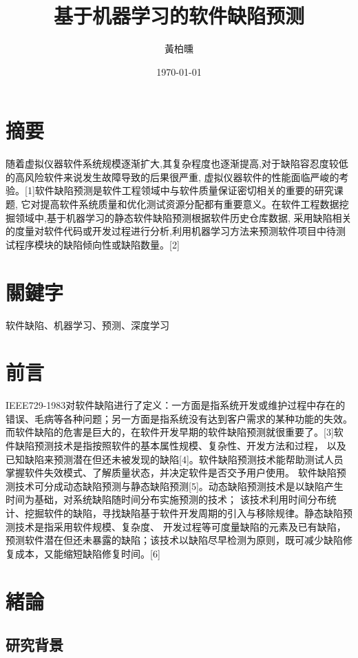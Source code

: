 \documentclass[12pt, a4paper]{article}
\author{黃柏曛}
\date{\today}
\title{基于机器学习的软件缺陷预测}
\begin{document}
\maketitle

\section{摘要}

随着虚拟仪器软件系统规模逐渐扩大,其复杂程度也逐渐提高,对于缺陷容忍度较低的高风险软件来说发生故障导致的后果很严重,
虚拟仪器软件的性能面临严峻的考验。[1]软件缺陷预测是软件工程领域中与软件质量保证密切相关的重要的研究课题,
它对提高软件系统质量和优化测试资源分配都有重要意义。在软件工程数据挖掘领域中,基于机器学习的静态软件缺陷预测根据软件历史仓库数据,
采用缺陷相关的度量对软件代码或开发过程进行分析,利用机器学习方法来预测软件项目中待测试程序模块的缺陷倾向性或缺陷数量。[2]

\section{關鍵字}

软件缺陷、机器学习、预测、深度学习 

\section{前言}

IEEE729-1983对软件缺陷进行了定义：一方面是指系统开发或维护过程中存在的错误、毛病等各种问题；另一方面是指系统没有达到客户需求的某种功能的失效。
而软件缺陷的危害是巨大的，在软件开发早期的软件缺陷预测就很重要了。[3]软件缺陷预测技术是指按照软件的基本属性规模、复杂性、开发方法和过程，
以及已知缺陷来预测潜在但还未被发现的缺陷[4]。软件缺陷预测技术能帮助测试人员掌握软件失效模式、了解质量状态，并决定软件是否交予用户使用。
软件缺陷预测技术可分成动态缺陷预测与静态缺陷预测[5]。动态缺陷预测技术是以缺陷产生时间为基础，对系统缺陷随时间分布实施预测的技术；
该技术利用时间分布统计、挖掘软件的缺陷，寻找缺陷基于软件开发周期的引入与移除规律。静态缺陷预测技术是指采用软件规模、复杂度、
开发过程等可度量缺陷的元素及已有缺陷，预测软件潜在但还未暴露的缺陷；该技术以缺陷尽早检测为原则，既可减少缺陷修复成本，又能缩短缺陷修复时间。[6]

\section{緒論}

\subsection{研究背景}
\end{document}
